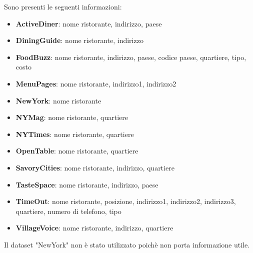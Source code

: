 \documentclass[a4paper,12pt]{article}
\begin{document}
\noindent Sono presenti le seguenti informazioni: 
\begin{itemize}
\item \textbf{ActiveDiner}: nome ristorante, indirizzo, paese
\item \textbf{DiningGuide}: nome ristorante, indirizzo
\item \textbf{FoodBuzz}: nome ristorante, indirizzo, paese, codice paese, quartiere, tipo, costo
\item \textbf{MenuPages}: nome ristorante, indirizzo1, indirizzo2
\item \textbf{NewYork}: nome ristorante
\item \textbf{NYMag}: nome ristorante, quartiere
\item \textbf{NYTimes}: nome ristorante, quartiere
\item \textbf{OpenTable}: nome ristorante, quartiere
\item \textbf{SavoryCities}: nome ristorante, indirizzo, quartiere
\item \textbf{TasteSpace}: nome ristorante, indirizzo, paese
\item \textbf{TimeOut}: nome ristorante, posizione, indirizzo1, indirizzo2, indirizzo3, quartiere, numero di telefono, tipo
\item \textbf{VillageVoice}: nome ristorante, indirizzo, quartiere
\end{itemize}

\noindent Il dataset "NewYork" non è stato utilizzato poichè non porta informazione utile.
\end{document}
